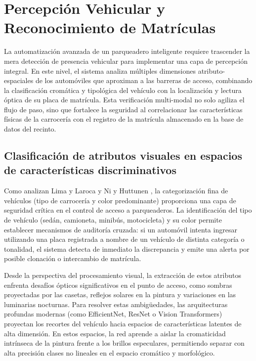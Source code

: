 \section{Percepción Vehicular y Reconocimiento de Matrículas}

La automatización avanzada de un parqueadero inteligente requiere trascender la
mera detección de presencia vehicular para implementar una capa de percepción
integral. En este nivel, el sistema analiza múltiples dimensiones
atributo-espaciales de los automóviles que aproximan a las barreras de acceso,
combinando la clasificación cromática y tipológica del vehículo con la
localización y lectura óptica de su placa de matrícula. Esta verificación
multi-modal no solo agiliza el flujo de paso, sino que fortalece la seguridad al
correlacionar las características físicas de la carrocería con el registro de la
matrícula almacenado en la base de datos del recinto.

\subsection{Clasificación de atributos visuales en espacios de características
discriminativos}

Como analizan Lima y Laroca \cite{lima2024vehiclecolor} y Ni y Huttunen
\cite{ni2021vehicle}, la categorización fina
de vehículos (tipo de carrocería y color predominante) proporciona una capa de
seguridad crítica en el control de acceso a parqueaderos. La identificación del
tipo de vehículo (sedán, camioneta, minibús, motocicleta) y su color permite
establecer mecanismos de auditoría cruzada: si un automóvil intenta ingresar
utilizando una placa registrada a nombre de un vehículo de distinta categoría o
tonalidad, el sistema detecta de inmediato la discrepancia y emite una alerta
por posible clonación o intercambio de matrícula.

Desde la perspectiva del procesamiento visual, la extracción de estos atributos
enfrenta desafíos ópticos significativos en el punto de acceso, como sombras
proyectadas por las casetas, reflejos solares en la pintura y variaciones en las
luminarias nocturnas. Para resolver estas ambigüedades, las arquitecturas
profundas modernas (como EfficientNet, ResNet o Vision Transformers) proyectan
los recortes del vehículo hacia espacios de características latentes de alta
dimensión. En estos espacios, la red aprende a aislar la cromaticidad intrínseca
de la pintura frente a los brillos especulares, permitiendo separar con alta
precisión clases no lineales en el espacio cromático y morfológico.

